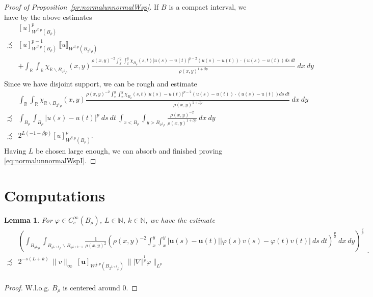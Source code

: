 \documentclass[a4paper,10pt,intlimits,ngerman]{amsart}
\newcommand{\iv}{B} %
\newtheorem{lemma}[theorem]{Lemma}
\numberwithin{equation}{section}
\newcommand{\R}{\mathbb{R}}
\newcommand{\N}{\mathbb{N}}
\newcommand{\solu}{{\boldsymbol{u}}}
\newcommand{\aleq}{\precsim}
\newcommand{\laps}[1]{|\nabla|^{#1}}
\newcommand{\brac}[1]{\left ( #1 \right )}
\begin{document}
\begin{appendix}
\begin{proof}[Proof of Proposition~\ref{pr:normalunnormalWsp}]
If $\iv$ is a compact interval, we have by the above estimates
\[
\begin{split}
&[u ]_{W^{\beta,p}(\iv_\rho)}^p\\
\aleq &[u]_{W^{\beta,p}(\iv_\rho)}^{p-1}\ \llbracket u \rrbracket_{W^{\beta,p}(\iv_{2^L \rho})}\\
&+\int_{\R} \int_{\R} \chi_{\R \backslash \iv_{2^L \rho}}(x,y) \frac{\rho(x,y)^{-2} \int_x^y\int_x^y \chi_{\iv_\rho}(s,t) |u(s)-u(t)|^{p-2} (u(s)-u(t)) \cdot (u(s)-u(t)) ds\ dt}{\rho(x,y)^{1+\beta p}}\ dx\ dy\\
\end{split}
\]
Since we have disjoint support, we can be rough and estimate
\[
\begin{split}
 &\int_{\R} \int_{\R} \chi_{\R \backslash \iv_{2^L \rho}}(x,y) \frac{\rho(x,y)^{-2} \int_x^y\int_x^y \chi_{\iv_\rho}(s,t) |u(s)-u(t)|^{p-2} (u(s)-u(t)) \cdot (u(s)-u(t)) ds\ dt}{\rho(x,y)^{1+\beta p}}\ dx\ dy\\
 \aleq &\int_{\iv_\rho} \int_{\iv_\rho} |u(s)-u(t)|^p\ ds\ dt\ \int_{x < \iv_\rho} \int_{y > \iv_{2^L\rho}} \frac{\rho(x,y)^{-2} }{\rho(x,y)^{1+\beta p}}\ dx\ dy\\
 \aleq& 2^{L(-1-\beta p)} [u]_{W^{\beta,p}(\iv_\rho)}^p.
\end{split}
 \]
Having $L$ be chosen large enough, we can absorb and finished proving \eqref{eq:normalunnormalWspI}.
\end{proof}


\section{Computations}

\begin{lemma}\label{la:disjointest1}
For $\varphi \in C_c^\infty(\iv_\rho)$, $L \in \N$, $k \in \N$, we have the estimate
\[
\begin{split}
 &\brac{\int_{\iv_{2^L \rho}}\int_{\iv_{2^{L+k} \rho} \backslash \iv_{2^{L+k-1}}} \frac{1}{\rho(x,y)^{2}} \brac{\rho(x,y)^{-2} \int_x^y \int_x^y |\solu(s)-\solu(t)||\varphi(s) v(s) - \varphi(t) v(t)|\ ds\ dt}^{\frac{p}{2}}\ dx\ dy}^{\frac{2}{p}}\\
 \aleq& 2^{-s(L+k)} \ \|v\|_\infty\ [\solu]_{W^{\frac{1}{p},p}(\iv_{2^{L+k}\rho })}\ \|\laps{\frac{1}{p}}\varphi\|_{L^{p}}\\
\end{split}.
\]
\end{lemma}
\begin{proof}
W.l.o.g. $\iv_\rho$ is centered around $0$. 


\end{proof}
\end{appendix}
\end{document}

